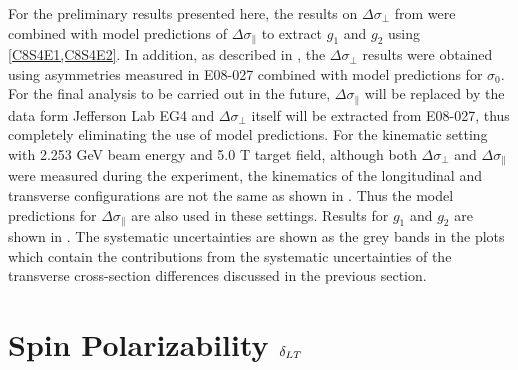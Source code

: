 For the preliminary results presented here, the results on $\Delta\sigma_\perp$ from  were combined with model predictions of $\Delta\sigma_\parallel$ to extract $g_1$ and $g_2$ using \cref{C8S4E1,C8S4E2}. In addition, as described in , the $\Delta\sigma_\perp$ results were obtained using asymmetries measured in E08-027 combined with model predictions for $\sigma_0$. For the final analysis to be carried out in the future, $\Delta\sigma_\parallel$ will be replaced by the data form Jefferson Lab EG4 and $\Delta\sigma_\perp$ itself will be extracted from E08-027, thus completely eliminating the use of model predictions. For the kinematic setting with 2.253 GeV beam energy and 5.0 T target field, although both $\Delta\sigma_\perp$ and $\Delta\sigma_\parallel$ were measured during the experiment, the kinematics of the longitudinal and transverse configurations are not the same as shown in . Thus the model predictions for $\Delta\sigma_\parallel$ are also used in these settings. Results for $g_1$ and $g_2$ are shown in . The systematic uncertainties are shown as the grey bands in the plots which contain the contributions from the systematic uncertainties of the transverse cross-section differences discussed in the previous section.

\section{\texorpdfstring{Spin Polarizability $\delta_{LT}$}{Spin Polarizability delta\_\{LT\}}}
\label{C8S5}

